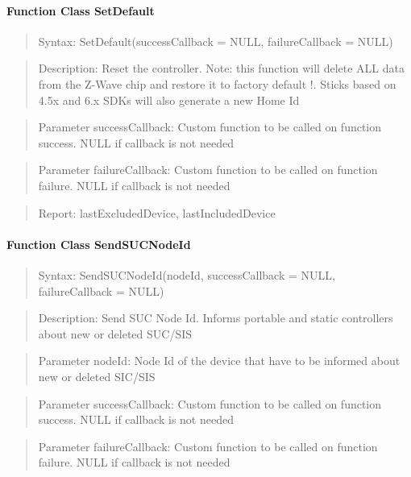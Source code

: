 \paragraph{Function Class SetDefault}
\begin{quote}Syntax: SetDefault(successCallback = NULL, failureCallback = NULL)\end{quote}
\begin{quote}Description: Reset the controller. Note: this function will delete ALL data from the Z-Wave chip and restore it to factory default !. Sticks based on 4.5x and 6.x SDKs will also generate a new Home Id\end{quote}
\begin{quote}Parameter successCallback: Custom function to be called on function success. NULL if callback is not needed\end{quote}
\begin{quote}Parameter failureCallback: Custom function to be called on function failure. NULL if callback is not needed\end{quote}
\begin{quote}Report: lastExcludedDevice, lastIncludedDevice\end{quote}

\paragraph{Function Class SendSUCNodeId}
\begin{quote}Syntax: SendSUCNodeId(nodeId, successCallback = NULL, failureCallback = NULL)\end{quote}
\begin{quote}Description: Send SUC Node Id. Informs portable and static controllers about new or deleted SUC/SIS\end{quote}
\begin{quote}Parameter nodeId: Node Id of the device that have to be informed about new or deleted SIC/SIS\end{quote}
\begin{quote}Parameter successCallback: Custom function to be called on function success. NULL if callback is not needed\end{quote}
\begin{quote}Parameter failureCallback: Custom function to be called on function failure. NULL if callback is not needed\end{quote}


